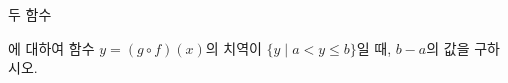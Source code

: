 두 함수\par\smallskip{}\par\smallskip\noindent 에 대하여 함수 $y=(g\circ f)(x)$의 치역이 $\{y \mid a<y\le b\}$일 때, $b-a$의 값을 구하시오.
